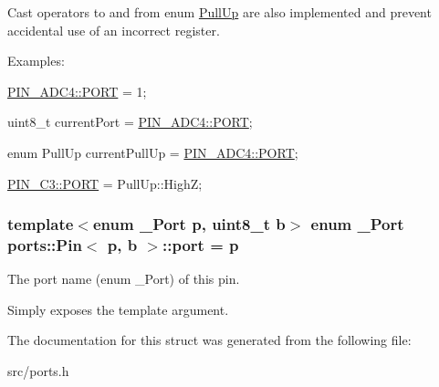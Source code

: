 Cast operators to and from enum \hyperlink{namespaceports_a49bf0ccedb4cfed89a328574e53bec07}{Pull\+Up} are also implemented and prevent accidental use of an incorrect register.

Examples\+:


\begin{DoxyItemize}
\item {\ttfamily \hyperlink{structports_1_1Pin_aaa08f0eb17ef31d9f46d65d50c8a093e}{P\+I\+N\+\_\+\+A\+D\+C4\+::\+P\+O\+RT} = 1;}
\item {\ttfamily uint8\+\_\+t current\+Port = \hyperlink{structports_1_1Pin_aaa08f0eb17ef31d9f46d65d50c8a093e}{P\+I\+N\+\_\+\+A\+D\+C4\+::\+P\+O\+RT};}
\item {\ttfamily enum Pull\+Up current\+Pull\+Up = \hyperlink{structports_1_1Pin_aaa08f0eb17ef31d9f46d65d50c8a093e}{P\+I\+N\+\_\+\+A\+D\+C4\+::\+P\+O\+RT};}
\item {\ttfamily \hyperlink{structports_1_1Pin_aaa08f0eb17ef31d9f46d65d50c8a093e}{P\+I\+N\+\_\+\+C3\+::\+P\+O\+RT} = Pull\+Up\+::\+HighZ;} 
\end{DoxyItemize}
\subsubsection[{\texorpdfstring{port}{port}}]{\setlength{\rightskip}{0pt plus 5cm}template$<$enum \+\_\+\+Port p, uint8\+\_\+t b$>$ enum {\bf \+\_\+\+Port} {\bf ports\+::\+Pin}$<$ p, b $>$\+::port = p\hspace{0.3cm}{\ttfamily [static]}}\hypertarget{structports_1_1Pin_ad63613b8c14441d28e3f3d935da67e77}{}\label{structports_1_1Pin_ad63613b8c14441d28e3f3d935da67e77}


The port name (enum \+\_\+\+Port) of this pin. 

Simply exposes the template argument. 

The documentation for this struct was generated from the following file\+:\begin{DoxyCompactItemize}
\item 
src/ports.\+h\end{DoxyCompactItemize}
